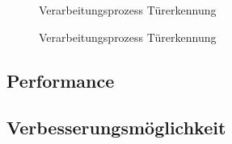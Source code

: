\begin{figure}
	\caption{Verarbeitungsprozess Türerkennung}
\end{figure}

\begin{figure}
	\ContinuedFloat
	\centering		
	
	\qquad
	\caption{Verarbeitungsprozess Türerkennung}
\end{figure}

\subsection{Performance}

\subsection{Verbesserungsmöglichkeit}